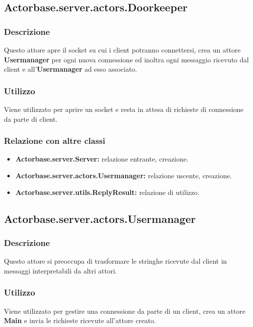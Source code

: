 \documentclass[a4paper]{article}
\begin{document}
		\subsection{Actorbase.server.actors.Doorkeeper}
			\subsubsection{Descrizione}
				Questo attore apre il socket su cui i client potranno connettersi, crea un attore \textbf{Usermanager} per ogni nuova 
				connessione ed inoltra ogni messaggio ricevuto dal client e  all'\textbf{Usermanager} ad esso associato.
				
			\subsubsection{Utilizzo}
				Viene utilizzato per aprire un socket e resta in attesa di richieste di connessione da parte di client.
				
			\subsubsection{Relazione con altre classi}
				\begin{itemize}
					\item \textbf{Actorbase.server.Server:} relazione entrante, creazione.
					\item \textbf{Actorbase.server.actors.Usermanager:} relazione uscente, creazione.
					\item \textbf{Actorbase.server.utils.ReplyResult:} relazione di utilizzo.
				\end{itemize}
				
		\subsection{Actorbase.server.actors.Usermanager}
			\subsubsection{Descrizione}
				Questo attore si preoccupa di trasformare le stringhe ricevute dal client in messaggi interpretabili da altri attori.
				
			\subsubsection{Utilizzo}
				Viene utilizzato per gestire una connessione da parte di un client, crea un attore \textbf{Main} e invia le richieste 
				ricevute all'attore creato. 
				
\end{document}
